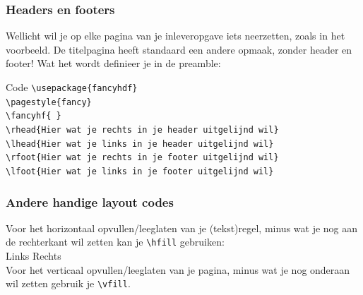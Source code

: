 \documentclass{beamer}
\begin{document}
\begin{frame}
	\frametitle{Headers en footers}
	Wellicht wil je op elke pagina van je inleveropgave iets neerzetten, zoals in het voorbeeld. De titelpagina heeft standaard een andere opmaak, zonder header en footer! Wat het wordt definieer je in de preamble:
	\begin{block}{Code}
		\texttt{\textbackslash usepackage\{fancyhdf\}}\\
		\texttt{\textbackslash pagestyle\{fancy\}}\\
		\texttt{\textbackslash fancyhf\{ \}}\\
		\texttt{\textbackslash rhead\{{\textnormal{Hier wat je rechts in je header uitgelijnd wil}}\}}\\
		\texttt{\textbackslash lhead\{{\textnormal{Hier wat je links in je header uitgelijnd wil}}\}}\\
		\texttt{\textbackslash rfoot\{{\textnormal{Hier wat je rechts in je footer uitgelijnd wil}}\}}\\
		\texttt{\textbackslash lfoot\{{\textnormal{Hier wat je links in je footer uitgelijnd wil}}\}}
	\end{block}
\end{frame}

\begin{frame}
	\frametitle{Andere handige layout codes}
	Voor het horizontaal opvullen/leeglaten van je (tekst)regel, minus wat je nog aan de rechterkant wil zetten kan je \texttt{\textbackslash hfill} gebruiken:\\
	Links \hfill Rechts\\
	
	Voor het verticaal opvullen/leeglaten van je pagina, \vfill minus wat je nog onderaan wil zetten gebruik je \texttt{\textbackslash vfill}.
\end{frame}
\end{document}
